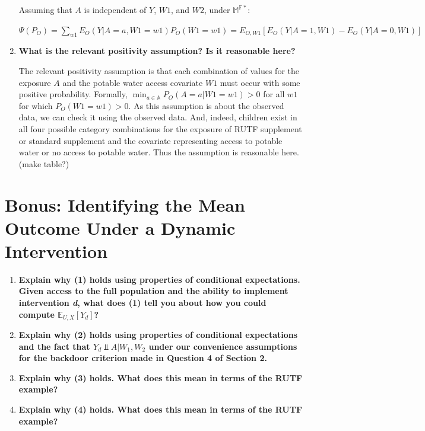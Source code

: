 \documentclass{article}\usepackage[]{graphicx}\usepackage[]{xcolor}
\begin{document}
\begin{enumerate}[label=\textbf{\alph*.}]
    Assuming that $A$ is independent of $Y$, $W1$, and $W2$, under $\mathbb{M}^{\mathbb{F}*}$:
    
    $\Psi(P_O) = \sum_{w1} E_O(Y | A = a, W1 = w1) P_O(W1 = w1) = E_{O,W1}[E_O(Y|A=1,W1) - E_O(Y|A=0,W1)]$
    
    \item \textbf{What is the relevant positivity assumption? Is it reasonable here?}
    
    The relevant positivity assumption is that each combination of values for the exposure $A$ and the potable water access covariate $W1$ must occur with some positive probability. Formally, $\min_{a \in \mathbb{A}} P_O(A=a|W1=w1)>0$ for all $w1$ for which $P_O(W1=w1)>0$. As this assumption is about the observed data, we can check it using the observed data. And, indeed, children exist in all four possible category combinations for the exposure of RUTF supplement or standard supplement and the covariate representing access to potable water or no access to potable water. Thus the assumption is reasonable here. (make table?)
  
  \end{enumerate}
  
\pagebreak

\section{Bonus: Identifying the Mean Outcome Under a Dynamic Intervention}

\begin{enumerate}[label=\textbf{\arabic*.}]
  
  \item \textbf{Explain why (1) holds using properties of conditional expectations. Given access to the full population and the ability to implement intervention \textit{d}, what does (1) tell you about how you could compute $\mathbb{E}_{U,X}[Y_d]$?}
  
  \item \textbf{Explain why (2) holds using properties of conditional expectations and the fact that $Y_d \Perp A|W_1, W_2$ under our convenience assumptions for the backdoor criterion made in Question 4 of Section 2.}
  
  \item \textbf{Explain why (3) holds. What does this mean in terms of the RUTF example?}
  
  \item \textbf{Explain why (4) holds. What does this mean in terms of the RUTF example?}
  
\end{enumerate}
\end{document}

